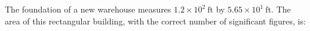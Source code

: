 The foundation of a new warehouse measures $1.2 \times 10^2 \ \text{ft}$ by $5.65 \times 10^1 \ \text{ft}$. 
The area of this rectangular building, with the correct number of significant figures, is:
